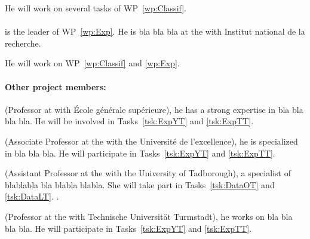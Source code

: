 He will work on several tasks of WP~\ref{wp:Classif}.

\paragraph*{} \hspace{-1em} is the leader of WP~\ref{wp:Exp}. He is bla bla bla at the  with Institut national de la recherche. \lipsum[9]

He will work on WP~\ref{wp:Classif} and \ref{wp:Exp}.

\paragraph*{Other project members:}  (Professor at  with École générale supérieure), he has a strong expertise in bla bla bla bla. He will be involved in Tasks~\ref{tsk:ExpYT} and \ref{tsk:ExpTT}.

 (Associate Professor at the  with the Université de l'excellence), he is specialized in bla bla bla. He will participate in Tasks~\ref{tsk:ExpYT} and \ref{tsk:ExpTT}.

 (Assistant Professor at the  with the University of Tadborough), a specialist of blablabla bla blabla blabla. She will take part in Tasks~\ref{tsk:DataOT} and \ref{tsk:DataLT}.
.

 (Professor at the  with Technische Universität Turmstadt), he works on bla bla bla bla. He will participate in Tasks~\ref{tsk:ExpYT} and \ref{tsk:ExpTT}.









